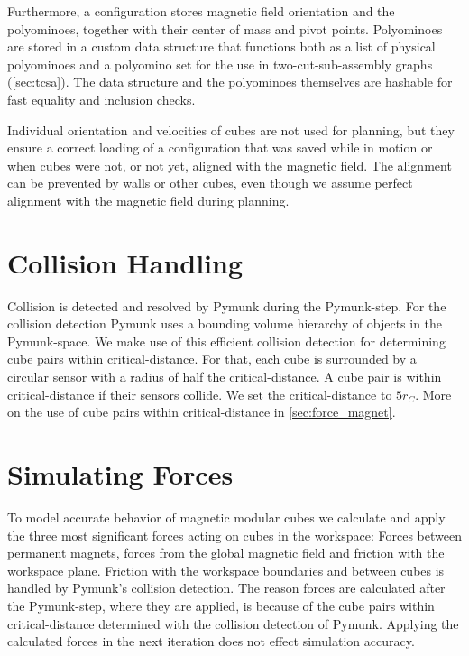 Furthermore, a configuration stores magnetic field orientation and the polyominoes, together with their center of mass and pivot points.
Polyominoes are stored in a custom data structure that functions both as a list of physical polyominoes and a polyomino set for the use in two-cut-sub-assembly graphs (\autoref{sec:tcsa}).
The data structure and the polyominoes themselves are hashable for fast equality and inclusion checks.

Individual orientation and velocities of cubes are not used for planning, but they ensure a correct loading of a configuration that was saved while in motion or when cubes were not, or not yet, aligned with the magnetic field.
The alignment can be prevented by walls or other cubes, even though we assume perfect alignment with the magnetic field during planning.


\section{Collision Handling}
\label{sec:coll_handling}

Collision is detected and resolved by Pymunk during the Pymunk-step.
For the collision detection Pymunk uses a bounding volume hierarchy of objects in the Pymunk-space.
We make use of this efficient collision detection for determining cube pairs within critical-distance.
For that, each cube is surrounded by a circular sensor with a radius of half the critical-distance.
A cube pair is within critical-distance if their sensors collide.
We set the critical-distance to $5 r_C$.
More on the use of cube pairs within critical-distance in \autoref{sec:force_magnet}.

\section{Simulating Forces}

To model accurate behavior of magnetic modular cubes we calculate and apply the three most significant forces acting on cubes in the workspace:
Forces between permanent magnets, forces from the global magnetic field and friction with the workspace plane.
Friction with the workspace boundaries and between cubes is handled by Pymunk's collision detection.
The reason forces are calculated after the Pymunk-step, where they are applied, is because of the cube pairs within critical-distance determined with the collision detection of Pymunk.
Applying the calculated forces in the next iteration does not effect simulation accuracy.

